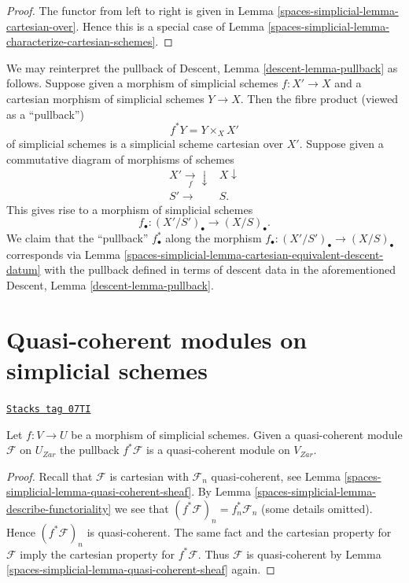 \begin{proof}
The functor from left to right is given in
Lemma \ref{spaces-simplicial-lemma-cartesian-over}.
Hence this is a special case of
Lemma \ref{spaces-simplicial-lemma-characterize-cartesian-schemes}.
\end{proof}

We may reinterpret the pullback of
Descent, Lemma \ref{descent-lemma-pullback} as follows.
Suppose given a morphism of simplicial schemes $f : X' \to X$ and a
cartesian morphism of simplicial schemes $Y \to X$. Then
the fibre product (viewed as a ``pullback'')
$$
f^*Y = Y \times_X X'
$$
of simplicial schemes is a simplicial scheme cartesian over $X'$.
Suppose given a commutative diagram of morphisms of schemes
$$
\begin{array}{cc}X' \underset{f}{\longrightarrow}\downarrow & X \downarrow \\ S' \longrightarrow & S.\end{array}
$$
This gives rise to a morphism of simplicial schemes
$$
f_\bullet : (X'/S')_\bullet \longrightarrow (X/S)_\bullet.
$$
We claim that the ``pullback'' $f_\bullet^*$ along the morphism
$f_\bullet : (X'/S')_\bullet \to (X/S)_\bullet$ corresponds via
Lemma \ref{spaces-simplicial-lemma-cartesian-equivalent-descent-datum}
with the pullback defined in terms of descent data in
the aforementioned
Descent, Lemma \ref{descent-lemma-pullback}.

\section{Quasi-coherent modules on simplicial schemes}
\label{spaces-simplicial-section-modules-simplicial}
\begin{lemma}
\label{spaces-simplicial-lemma-pullback-cartesian-module}
\href{https://stacks.math.columbia.edu/tag/07TI}{\texttt{Stacks tag 07TI}}

Let $f : V \to U$ be a morphism of simplicial schemes. Given a
quasi-coherent module $\mathcal{F}$ on $U_{Zar}$ the pullback
$f^*\mathcal{F}$ is a quasi-coherent module on $V_{Zar}$.
\end{lemma}

\begin{proof}
Recall that $\mathcal{F}$ is cartesian with $\mathcal{F}_n$
quasi-coherent, see Lemma \ref{spaces-simplicial-lemma-quasi-coherent-sheaf}.
By Lemma \ref{spaces-simplicial-lemma-describe-functoriality} we see that
$(f^*\mathcal{F})_n = f_n^*\mathcal{F}_n$ (some details omitted).
Hence $(f^*\mathcal{F})_n$ is quasi-coherent.
The same fact and the cartesian property for $\mathcal{F}$
imply the cartesian property for $f^*\mathcal{F}$.
Thus $\mathcal{F}$ is quasi-coherent by
Lemma \ref{spaces-simplicial-lemma-quasi-coherent-sheaf} again.
\end{proof}


